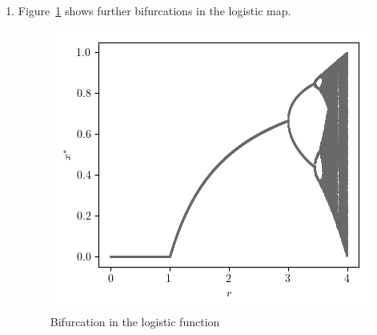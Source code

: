 \documentclass[12pt,a4]{article}
\begin{document}
\begin{enumerate}
  \item
    Figure~\ref{fig:furtherEquilibriumPointsBifurcations} shows further bifurcations in the logistic map.

    \begin{figure}[H]
      \centering
      \includegraphics[scale = 0.85]{../figs/furtherEquilibriumPointsBifurcations.png}
      \caption{Bifurcation in the logistic function}
      \label{fig:furtherEquilibriumPointsBifurcations}
    \end{figure}
\end{enumerate}
\end{document}
